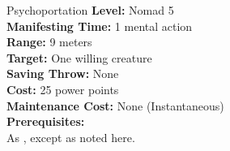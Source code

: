 {Psychoportation}
{
	\textbf{Level:}
	Nomad 5\\
	\textbf{Manifesting Time:}
	1 mental action\\
	\textbf{Range:}
	9 meters\\
	\textbf{Target:}
	One willing creature\\
	\textbf{Saving Throw:}
	None\\
	\textbf{Cost:}
	25 power points\\
	\textbf{Maintenance Cost:}
	None (Instantaneous)\\
	\textbf{Prerequisites:}
	\\
}
{
	As , except as noted here.
}